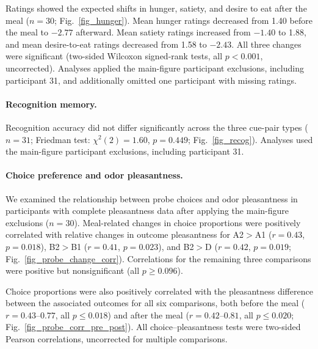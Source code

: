 \documentclass[9pt,twoside,lineno]{pnas-new}
\begin{document}
Ratings showed the expected shifts in hunger, satiety, and desire to eat after the meal ($n = 30$; Fig.~\ref{fig_hunger}). Mean hunger ratings decreased from 1.40 before the meal to $-2.77$ afterward. Mean satiety ratings increased from $-1.40$ to 1.88, and mean desire-to-eat ratings decreased from 1.58 to $-2.43$. All three changes were significant (two-sided Wilcoxon signed-rank tests, all $p < 0.001$, uncorrected). Analyses applied the main-figure participant exclusions, including participant 31, and additionally omitted one participant with missing ratings.

\paragraph*{Recognition memory.}

Recognition accuracy did not differ significantly across the three cue-pair types ($n = 31$; Friedman test: $\chi^2(2) = 1.60$, $p = 0.449$; Fig.~\ref{fig_recog}). Analyses used the main-figure participant exclusions, including participant 31.

\paragraph*{Choice preference and odor pleasantness.}

We examined the relationship between probe choices and odor pleasantness in participants with complete pleasantness data after applying the main-figure exclusions ($n = 30$). Meal-related changes in choice proportions were positively correlated with relative changes in outcome pleasantness for A2$>$A1 ($r = 0.43$, $p = 0.018$), B2$>$B1 ($r = 0.41$, $p = 0.023$), and B2$>$D ($r = 0.42$, $p = 0.019$; Fig.~\ref{fig_probe_change_corr}). Correlations for the remaining three comparisons were positive but nonsignificant (all $p \geq 0.096$).

Choice proportions were also positively correlated with the pleasantness difference between the associated outcomes for all six comparisons, both before the meal ($r = 0.43$--$0.77$, all $p \leq 0.018$) and after the meal ($r = 0.42$--$0.81$, all $p \leq 0.020$; Fig.~\ref{fig_probe_corr_pre_post}). All choice--pleasantness tests were two-sided Pearson correlations, uncorrected for multiple comparisons.

\end{document}

